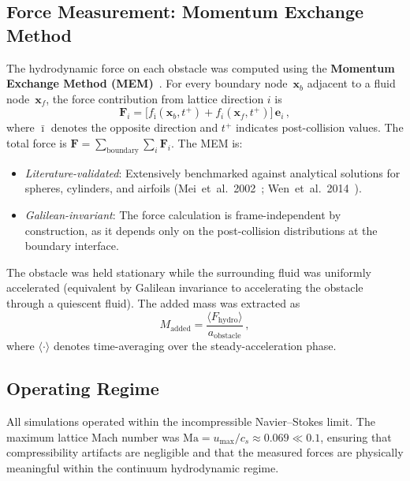 \documentclass[reprint,amsmath,amssymb,aps,pre,floatfix]{revtex4-2}
\begin{document}
\subsection{Force Measurement: Momentum Exchange Method}
\label{sec:mem}

The hydrodynamic force on each obstacle was computed using the
\textbf{Momentum Exchange Method (MEM)}~\cite{Mei2002,Wen2014}.  For every
boundary node~$\mathbf{x}_b$ adjacent to a fluid
node~$\mathbf{x}_f$, the force contribution from lattice direction $i$ is
\begin{equation}
\mathbf{F}_i
  = \bigl[f_{\bar{\imath}}(\mathbf{x}_b,t^{+})
         + f_i(\mathbf{x}_f,t^{+})\bigr]\,\mathbf{e}_i\,,
\label{eq:mem}
\end{equation}
where $\bar{\imath}$ denotes the opposite direction and $t^{+}$ indicates
post-collision values.  The total force is
$\mathbf{F}=\sum_{\mathrm{boundary}}\sum_i \mathbf{F}_i$.  The MEM is:
\begin{itemize}
\item \emph{Literature-validated}: Extensively benchmarked against
  analytical solutions for spheres, cylinders, and airfoils
  (Mei~et~al.\ 2002~\cite{Mei2002}; Wen~et~al.\ 2014~\cite{Wen2014}).
\item \emph{Galilean-invariant}: The force calculation is frame-independent
  by construction, as it depends only on the post-collision distributions
  at the boundary interface.
\end{itemize}

The obstacle was held stationary while the surrounding fluid was uniformly
accelerated (equivalent by Galilean invariance to accelerating the obstacle
through a quiescent fluid).  The added mass was extracted as
\begin{equation}
M_{\mathrm{added}}
  = \frac{\langle F_{\mathrm{hydro}}\rangle}{a_{\mathrm{obstacle}}}\,,
\label{eq:madded}
\end{equation}
where $\langle\cdot\rangle$ denotes time-averaging over the
steady-acceleration phase.

\subsection{Operating Regime}
\label{sec:regime}

All simulations operated within the incompressible Navier--Stokes limit.
The maximum lattice Mach number was
$\mathrm{Ma}=u_{\max}/c_s\approx0.069\ll0.1$, ensuring that
compressibility artifacts are negligible and that the measured forces are
physically meaningful within the continuum hydrodynamic regime.
\end{document}
